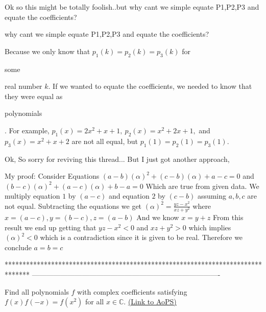 \begin{solution}
	Ok so this might be totally foolish..but why cant we simple equate P1,P2,P3 and equate the coefficients?
\end{solution}



\begin{solution}
	\begin{tcolorbox} why cant we simple equate P1,P2,P3 and equate the coefficients?\end{tcolorbox}
Because we only know that $p_1(k)=p_2(k)=p_3(k)$ for \begin{bolded}some\end{bolded} real number $k$. If we wanted to equate the coefficients, we needed to know that they were equal as \begin{italicized}polynomials\end{italicized}.
For example, $p_1(x)=2x^2+x+1,\ p_2(x)=x^2+2x+1,$ and $p_3(x)=x^2+x+2$ are not all equal, but $p_1(1)=p_2(1)=p_3(1)$.
\end{solution}



\begin{solution}
	Ok, So sorry for reviving this thread...
But I just got another approach, 

My proof:
Consider  Equations $(a-b)(\alpha )^2+(c-b)(\alpha )+a-c=0 $ and $(b-c)(\alpha )^2+(a-c)(\alpha )+b-a=0$ Which are true from given data.
We multiply equation $1$ by $(a-c)$ and equation $2$ by $(c-b)$ assuming $a,b,c$ are not equal.
Subtracting the equations we get $ (\alpha )^2=\frac{yz-x^2}{xz+y^2} $ 
where $x=(a-c), y=(b-c), z=(a-b)$
And we know $x=y+z$ 
From this result we end up getting that $ yz-x^2<0 $ and $xz+y^2>0$ 
which implies $(\alpha )^2<0$ which is a contradiction since it is given to be real. 
Therefore we conclude $a=b=c$
\end{solution}
*******************************************************************************
-------------------------------------------------------------------------------

\begin{problem}
	Find all polynomials $f$ with complex coefficients satisfying $f(x)f(-x)=f(x^2)$ for all $x \in \mathbb C$.
	\flushright \href{https://artofproblemsolving.com/community/c6h380956}{(Link to AoPS)}
\end{problem}



